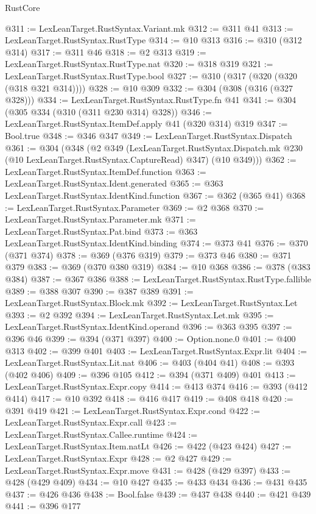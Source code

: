 \begin{lexlean}{RustCore}
\begin{coremodule}
@311 := LexLeanTarget.RustSyntax.Variant.mk
@312 := @311 @41
@313 := LexLeanTarget.RustSyntax.RustType
@314 := @10 @313
@316 := @310 (@312 @314)
@317 := @311 @46
@318 := @2 @313
@319 := LexLeanTarget.RustSyntax.RustType.nat
@320 := @318 @319
@321 := LexLeanTarget.RustSyntax.RustType.bool
@327 := @310 (@317 (@320 (@320 (@318 @321 @314))))
@328 := @10 @309
@332 := @304 (@308 (@316 (@327 @328)))
@334 := LexLeanTarget.RustSyntax.RustType.fn @41
@341 := @304 (@305 @334 (@310 (@311 @230 @314) @328))
@346 := LexLeanTarget.RustSyntax.ItemDef.apply @41 (@320 @314) @319
@347 := Bool.true
@348 := @346 @347
@349 := LexLeanTarget.RustSyntax.Dispatch
@361 := @304
    (@348
      (@2
        @349
        (LexLeanTarget.RustSyntax.Dispatch.mk @230 (@10 LexLeanTarget.RustSyntax.CaptureRead) @347)
        (@10 @349)))
@362 := LexLeanTarget.RustSyntax.ItemDef.function
@363 := LexLeanTarget.RustSyntax.Ident.generated
@365 := @363 LexLeanTarget.RustSyntax.IdentKind.function
@367 := @362 (@365 @41)
@368 := LexLeanTarget.RustSyntax.Parameter
@369 := @2 @368
@370 := LexLeanTarget.RustSyntax.Parameter.mk
@371 := LexLeanTarget.RustSyntax.Pat.bind
@373 := @363 LexLeanTarget.RustSyntax.IdentKind.binding
@374 := @373 @41
@376 := @370 (@371 @374)
@378 := @369 (@376 @319)
@379 := @373 @46
@380 := @371 @379
@383 := @369 (@370 @380 @319)
@384 := @10 @368
@386 := @378 (@383 @384)
@387 := @367 @386
@388 := LexLeanTarget.RustSyntax.RustType.fallible
@389 := @388 @307
@390 := @387 @389
@391 := LexLeanTarget.RustSyntax.Block.mk
@392 := LexLeanTarget.RustSyntax.Let
@393 := @2 @392
@394 := LexLeanTarget.RustSyntax.Let.mk
@395 := LexLeanTarget.RustSyntax.IdentKind.operand
@396 := @363 @395
@397 := @396 @46
@399 := @394 (@371 @397)
@400 := Option.none.{0}
@401 := @400 @313
@402 := @399 @401
@403 := LexLeanTarget.RustSyntax.Expr.lit
@404 := LexLeanTarget.RustSyntax.Lit.nat
@406 := @403 (@404 @41)
@408 := @393 (@402 @406)
@409 := @396 @105
@412 := @394 (@371 @409) @401
@413 := LexLeanTarget.RustSyntax.Expr.copy
@414 := @413 @374
@416 := @393 (@412 @414)
@417 := @10 @392
@418 := @416 @417
@419 := @408 @418
@420 := @391 @419
@421 := LexLeanTarget.RustSyntax.Expr.cond
@422 := LexLeanTarget.RustSyntax.Expr.call
@423 := LexLeanTarget.RustSyntax.Callee.runtime
@424 := LexLeanTarget.RustSyntax.Item.natLt
@426 := @422 (@423 @424)
@427 := LexLeanTarget.RustSyntax.Expr
@428 := @2 @427
@429 := LexLeanTarget.RustSyntax.Expr.move
@431 := @428 (@429 @397)
@433 := @428 (@429 @409)
@434 := @10 @427
@435 := @433 @434
@436 := @431 @435
@437 := @426 @436
@438 := Bool.false
@439 := @437 @438
@440 := @421 @439
@441 := @396 @177

\end{coremodule}
\end{lexlean}
